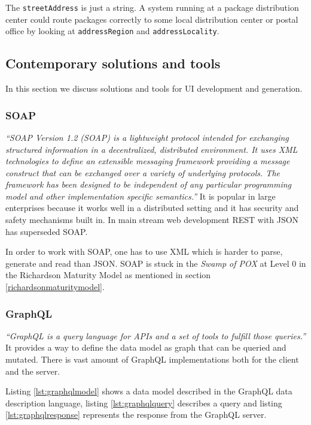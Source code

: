 The \lstinline{streetAddress} is just a string. A system running at a package distribution center could route packages correctly to some local distribution center or postal office by looking at \lstinline{addressRegion} and \lstinline{addressLocality}.

\subsection{Contemporary solutions and tools}\label{sec:contemporarysolutions}
In this section we discuss solutions and tools for UI development and generation.

\subsubsection{SOAP}\label{sec:soap}
\textit{``SOAP Version 1.2 (SOAP) is a lightweight protocol intended for exchanging structured information in a decentralized, distributed environment. It uses XML technologies to define an extensible messaging framework providing a message construct that can be exchanged over a variety of underlying protocols. The framework has been designed to be independent of any particular programming model and other implementation specific semantics.''} \citep{soap}
It is popular in large enterprises because it works well in a distributed setting and it has security and safety mechanisms built in. In main stream web development REST with JSON has superseded SOAP.

In order to work with SOAP, one has to use XML which is harder to parse, generate and read than JSON. SOAP is stuck in the \textit{Swamp of POX} at Level 0 in the Richardson Maturity Model as mentioned in section \ref{richardsonmaturitymodel}.

\subsubsection{GraphQL}\label{graphql}
\textit{``GraphQL is a query language for APIs and a set of tools to fulfill those queries.''} \citep{graphql} It provides a way to define the data model as graph that can be queried and mutated. There is vast amount of GraphQL implementations both for the client and the server.

Listing \ref{lst:graphqlmodel} shows a data model described in the GraphQL data description language, listing \ref{lst:graphqlquery} describes a query and listing \ref{lst:graphqlresponse} represents the response from the GraphQL server.

